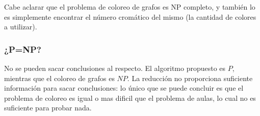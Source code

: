 \documentclass{article}
\begin{document}
Cabe aclarar que el problema de coloreo de grafos es NP completo, y también lo es simplemente encontrar el número cromático del mismo (la cantidad de colores a utilizar).
\subsubsection{¿P=NP?}
No se pueden sacar conclusiones al respecto. El algoritmo propuesto es $P$, mientras que el coloreo de grafos es $NP$. La reducción no proporciona suficiente información para sacar conclusiones: lo único que se puede concluir es que el problema de coloreo es igual o mas dificil que el problema de aulas, lo cual no es suficiente para probar nada.
\end{document}
